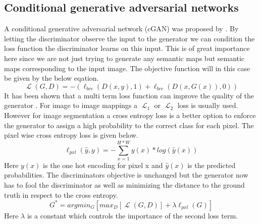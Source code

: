 \documentclass{kththesis}
\DeclareMathOperator{\Lagr}{\mathcal{L}}
\begin{document}
\subsection{Conditional generative adversarial networks}
A conditional generative adversarial network (cGAN) was proposed by \parencite{mirza_conditional_2014}.
By letting the discriminator observe the input to the generator we can condition the loss function the discriminator learns on this input. This is of great importance here since we are not just trying to generate any semantic maps but semantic maps corresponding to the input image. The objective function will in this case be given by the below eqation.
\begin{equation}
\Lagr(G, D) =  -(\ell_{bce}(D(x, y), 1) + \ell_{bce}(D(x, G(x)), 0))\label{eq:cgan}
\end{equation}
It has been shown that a multi term loss function can improve the quality of the generator \parencite{pathak_context_2016, isola_image--image_2016}. For image to image mappings a $\Lagr_1$ or $\Lagr_2$ loss is usually used. However for image segmentation a cross entropy loss is a better option to enforce the generator to assign a high probability to the correct class for each pixel. The pixel wise cross entropy loss is given below.
\begin{equation}\label{eq:mce}
\ell_{pxl}(\hat{y}, y) = - \sum_{x=1}^{H*W}y(x)*log(\hat{y}(x))
\end{equation}
Here $y(x)$ is the one hot encoding for pixel x and $\hat{y}(x)$ is the predicted probabilities. The discriminators objective is unchanged but the generator now has to fool the discriminator as well as minimizing the distance to the ground truth in respect to the cross entropy.
\begin{equation}
G^{*}=argmin_{G}[max_{D}[\Lagr(G, D)] + \lambda \ell_{pxl}(G)]
\end{equation}
Here $\lambda$ is a constant which controls the importance of the second  loss term.
\end{document}
